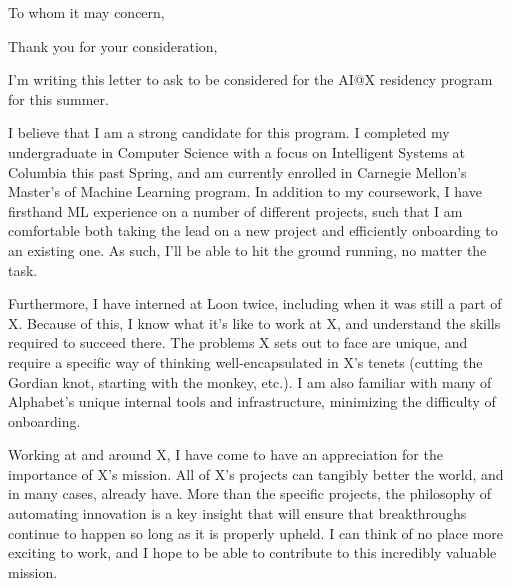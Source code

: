 \documentclass[11pt,a4paper,sans]{moderncv}        %
\begin{document}
\date{September 27, 2019}
\opening{To whom it may concern,}
\closing{Thank you for your consideration,}
\makelettertitle
I'm writing this letter to ask to be considered for the AI@X residency program for this summer.

I believe that I am a strong candidate for this program. I completed my undergraduate in
Computer Science with a focus on Intelligent Systems at Columbia this past Spring, and am
currently enrolled in Carnegie Mellon's Master's of Machine Learning program. In addition to
my coursework, I have firsthand ML experience on a number of different projects, such that I
am comfortable both taking the lead on a new project and efficiently onboarding to an existing
one. As such, I'll be able to hit the ground running, no matter the task.

Furthermore, I have interned at Loon twice, including when it was still a part of X. Because of this, I know
what it's like to work at X, and understand the skills required to succeed there. The problems
X sets out to face are unique, and require a specific way of thinking well-encapsulated in X's tenets
(cutting the Gordian knot, starting with the monkey, etc.). I am also familiar with many of Alphabet's
unique internal tools and infrastructure, minimizing the difficulty of onboarding.

Working at and around X, I have come to have an appreciation for the importance of X's mission. All of X's
projects can tangibly better the world, and in many cases, already have. More than the specific projects,
the philosophy of automating innovation is a key insight that will ensure that breakthroughs continue
to happen so long as it is properly upheld. I can think of no place more exciting to work, and I hope
to be able to contribute to this incredibly valuable mission.

\makeletterclosing
\end{document}

